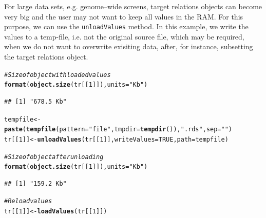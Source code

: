 \documentclass{article}\usepackage[]{graphicx}\usepackage[]{color}
\makeatletter
\newcommand{\hlnum}[1]{\textcolor[rgb]{0.686,0.059,0.569}{#1}}%
\newcommand{\hlstr}[1]{\textcolor[rgb]{0.192,0.494,0.8}{#1}}%
\newcommand{\hlcom}[1]{\textcolor[rgb]{0.678,0.584,0.686}{\textit{#1}}}%
\newcommand{\hlstd}[1]{\textcolor[rgb]{0.345,0.345,0.345}{#1}}%
\newcommand{\hlkwb}[1]{\textcolor[rgb]{0.69,0.353,0.396}{#1}}%
\newcommand{\hlkwc}[1]{\textcolor[rgb]{0.333,0.667,0.333}{#1}}%
\newcommand{\hlkwd}[1]{\textcolor[rgb]{0.737,0.353,0.396}{\textbf{#1}}}%
\newenvironment{kframe}{%
 \def\at@end@of@kframe{}%
 \ifinner\ifhmode%
  \def\at@end@of@kframe{\end{minipage}}%
  \begin{minipage}{\columnwidth}%
 \fi\fi%
 \def\FrameCommand##1{\hskip\@totalleftmargin \hskip-\fboxsep
 \colorbox{shadecolor}{##1}\hskip-\fboxsep
     \hskip-\linewidth \hskip-\@totalleftmargin \hskip\columnwidth}%
 \MakeFramed {\advance\hsize-\width
   \@totalleftmargin\z@ \linewidth\hsize
   \@setminipage}}%
 {\par\unskip\endMakeFramed%
 \at@end@of@kframe}
\newenvironment{knitrout}{}{} %
\makeatother
\begin{document}
For large data sets, e.g. genome--wide screens, target relations objects can become very big and the user may not want to keep all values in the RAM. For this purpose, we can use the \texttt{unloadValues} method. In this example, we write the values to a temp-file, i.e. not the original source file, which may be required, when we do not want to overwrite exisiting data, after, for instance, subsetting the target relations object.
\begin{knitrout}
\color{fgcolor}\begin{kframe}
\begin{alltt}
  \hlcom{# Size of object with loaded values}
  \hlkwd{format}\hlstd{(}\hlkwd{object.size}\hlstd{(tr[[}\hlnum{1}\hlstd{]]),} \hlkwc{units} \hlstd{=} \hlstr{"Kb"}\hlstd{)}
\end{alltt}
\begin{verbatim}
## [1] "678.5 Kb"
\end{verbatim}
\begin{alltt}
  \hlstd{tempfile} \hlkwb{<-} \hlkwd{paste}\hlstd{(}\hlkwd{tempfile}\hlstd{(}\hlkwc{pattern} \hlstd{=} \hlstr{"file"}\hlstd{,} \hlkwc{tmpdir} \hlstd{=} \hlkwd{tempdir}\hlstd{()),} \hlstr{".rds"}\hlstd{,} \hlkwc{sep}\hlstd{=}\hlstr{""}\hlstd{)}
  \hlstd{tr[[}\hlnum{1}\hlstd{]]} \hlkwb{<-} \hlkwd{unloadValues}\hlstd{(tr[[}\hlnum{1}\hlstd{]],} \hlkwc{writeValues} \hlstd{=} \hlnum{TRUE}\hlstd{,} \hlkwc{path} \hlstd{= tempfile)}

  \hlcom{# Size of object after unloading}
  \hlkwd{format}\hlstd{(}\hlkwd{object.size}\hlstd{(tr[[}\hlnum{1}\hlstd{]]),} \hlkwc{units} \hlstd{=} \hlstr{"Kb"}\hlstd{)}
\end{alltt}
\begin{verbatim}
## [1] "159.2 Kb"
\end{verbatim}
\begin{alltt}
  \hlcom{# Reload values}
  \hlstd{tr[[}\hlnum{1}\hlstd{]]} \hlkwb{<-} \hlkwd{loadValues}\hlstd{(tr[[}\hlnum{1}\hlstd{]])}
\end{alltt}
\end{kframe}
\end{knitrout}
\end{document}

